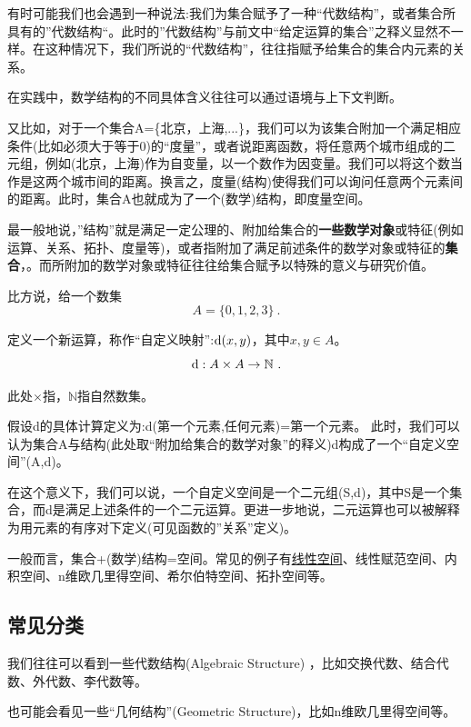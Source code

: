 有时可能我们也会遇到一种说法:我们为集合赋予了一种“代数结构”，或者集合所具有的”代数结构“。此时的”代数结构”与前文中“给定运算的集合”之释义显然不一样。在这种情况下，我们所说的“代数结构”，往往指赋予给集合的集合内元素的关系。

在实践中，数学结构的不同具体含义往往可以通过语境与上下文判断。

又比如，对于一个集合A=\{北京，上海,...\}，我们可以为该集合附加一个满足相应条件(比如必须大于等于0)的“度量”，或者说距离函数，将任意两个城市组成的二元组，例如(北京，上海)作为自变量，以一个数作为因变量。我们可以将这个数当作是这两个城市间的距离。换言之，度量(结构)使得我们可以询问任意两个元素间的距离。此时，集合A也就成为了一个(数学)结构，即度量空间。

最一般地说，”结构”就是满足一定公理的、附加给集合的\textbf{一些数学对象}或特征(例如运算、关系、拓扑、度量等)，或者指附加了满足前述条件的数学对象或特征的\textbf{集合}，。而所附加的数学对象或特征往往给集合赋予以特殊的意义与研究价值。

比方说，给一个数集
\begin{equation}
A = \{ 0,1,2,3 \}~.
\end{equation}

定义一个新运算，称作“自定义映射”:${\rm d}(x,y)$，其中$x,y\in A$。
\begin{equation}
{\rm d}:A \times A  \to {\mathbb N}~.
\end{equation}

此处$\times$指，${\mathbb N}$指自然数集。

假设d的具体计算定义为:d(第一个元素,任何元素)=第一个元素。
此时，我们可以认为集合A与结构(此处取“附加给集合的数学对象”的释义)d构成了一个“自定义空间”(A,d)。

在这个意义下，我们可以说，一个自定义空间是一个二元组(S,d)，其中S是一个集合，而d是满足上述条件的一个二元运算。更进一步地说，二元运算也可以被解释为用元素的有序对下定义(可见函数的”关系”定义)。

一般而言，集合+(数学)结构=空间。常见的例子有\href{https://wuli.wiki/online/LSpace.html}{线性空间}、线性赋范空间、内积空间、n维欧几里得空间、希尔伯特空间、拓扑空间等。

\subsection{常见分类}
我们往往可以看到一些代数结构(Algebraic Structure) ，比如交换代数、结合代数、外代数、李代数等。

也可能会看见一些“几何结构”(Geometric Structure)，比如n维欧几里得空间等。

